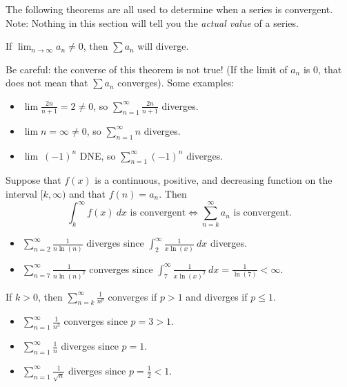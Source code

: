 The following theorems are all used to determine when a series is convergent. Note: Nothing in this section will tell you the \textit{actual value} of a series.


\begin{thm} If $\displaystyle \lim_{n\to\infty}a_n\neq 0$, then $\sum a_n$ will diverge.
\end{thm}
Be careful: the converse of this theorem is not true! (If the limit of $a_n$ is 0, that does not mean that $\sum a_n$ converges).  Some examples:

\begin{itemize}
\item $\lim\frac{2n}{n+1}=2\neq 0$, so $\displaystyle\sum_{n=1}^\infty \frac{2n}{n+1}$ diverges.
\item $\lim n = \infty\neq 0$, so $\displaystyle\sum_{n=1}^\infty n$ diverges.
\item $\lim\ (-1)^n$ DNE, so $\displaystyle\sum_{n=1}^\infty (-1)^n$ diverges.

\end{itemize}


\begin{thm}
Suppose that $f(x)$ is a continuous, positive, and decreasing function on the interval $[k,\infty)$ and that $f(n)=a_n$. Then
$$\int_k^\infty f(x)\ dx\text{ is convergent} \iff \sum_{n=k}^\infty a_n\text{ is convergent}.$$
\end{thm}

\begin{itemize}
\item $\displaystyle \sum_{n=2}^\infty \frac{1}{n\ln(n)}$ diverges since $\displaystyle\int_2^\infty \frac{1}{x\ln(x)}\ dx$ diverges.
\item $\displaystyle \sum_{n=7}^\infty \frac{1}{n\ln(n)^2}$ converges since $\displaystyle\int_7^\infty \frac{1}{x\ln(x)^2}\ dx=\frac{1}{\ln(7)}<\infty$.
\end{itemize}


\begin{thm}
\phantom{}

If $k>0$, then $\displaystyle\sum_{n=k}^\infty\frac{1}{n^p}$ converges if $p>1$ and diverges if $p\leq 1$.
\end{thm}


\begin{itemize}
\item $\displaystyle \sum_{n=1}^\infty \frac{1}{n^3}$ converges since $p=3>1$.
\item $\displaystyle \sum_{n=1}^\infty \frac{1}{n}$ diverges since $p=1$.
\item $\displaystyle \sum_{n=1}^\infty \frac{1}{\sqrt{n}}$ diverges since $p=\frac{1}{2}<1$.
\end{itemize}



